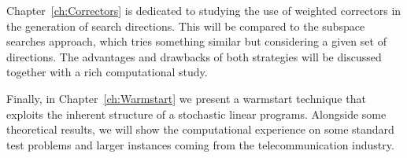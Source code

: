 Chapter~\ref{ch:Correctors} is dedicated to studying the use of
weighted correctors in the generation of search directions. This will
be compared to the subspace searches approach, which tries something
similar but considering a given set of directions. The advantages
and drawbacks of both strategies will be discussed together with
a rich computational study.

Finally, in Chapter~\ref{ch:Warmstart} we present a warmstart technique
that exploits the inherent structure of a stochastic linear programs.
Alongside some theoretical results, we will show the computational
experience on some standard test problems and larger instances coming
from the telecommunication industry.
